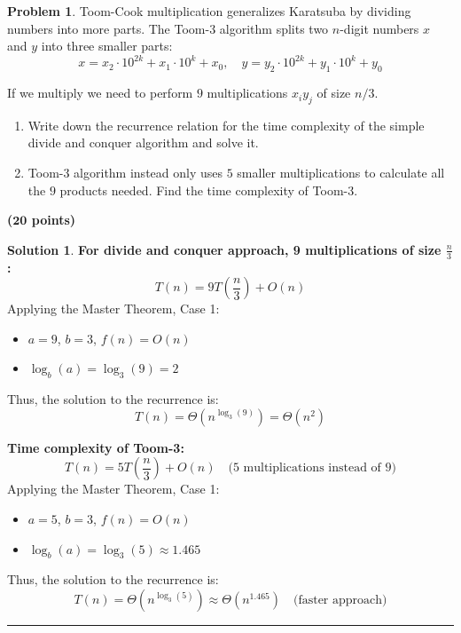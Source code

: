 \documentclass{article}
\theoremstyle{definition}
\newtheorem{problem}{Problem}
\def\fline{\rule{0.75\linewidth}{0.5pt}}
\newcommand{\finishline}{\begin{center}\fline\end{center}}
\newtheorem*{solution*}{Solution}
\newenvironment{solution}{\begin{solution*}}{{\finishline} \end{solution*}}
\newcommand{\grade}[1]{\hfill{\textbf{($\mathbf{#1}$ points)}}}
\begin{document}
\begin{problem}
Toom-Cook multiplication generalizes Karatsuba by dividing numbers into more parts. The Toom-3 algorithm splits two $n$-digit numbers $x$ and $y$ into three smaller parts:
\[
x = x_2 \cdot 10^{2k} + x_1 \cdot 10^k + x_0, \quad y = y_2 \cdot 10^{2k} + y_1 \cdot 10^k + y_0
\]

If we multiply we need to perform $9$  multiplications $x_iy_j$ of size $n/3$.

\begin{enumerate}
    \item Write down the recurrence relation for the time complexity of the simple divide and conquer algorithm and solve it.

\item Toom-3 algorithm instead only uses $5$ smaller multiplications to calculate all the $9$ products needed. Find the time complexity of Toom-3.
    
\end{enumerate}

\end{problem}\grade{20}
\begin{solution}
	\textbf{For divide and conquer approach, 9 multiplications of size \( \frac{n}{3} \):}
	\[
	T(n) = 9T\left(\frac{n}{3}\right) + O(n)
	\]
	Applying the Master Theorem, Case 1:
	\begin{itemize}
	    \item \( a = 9 \), \( b = 3 \), \( f(n) = O(n) \)
	    \item \( \log_b(a) = \log_3(9) = 2 \)
	\end{itemize}
	Thus, the solution to the recurrence is:
	\[
	T(n) = \Theta\left(n^{\log_3(9)}\right) = \Theta(n^2)
	\]
	
	\textbf{Time complexity of Toom-3:}
	\[
	T(n) = 5T\left(\frac{n}{3}\right) + O(n) \quad \text{(5 multiplications instead of 9)}
	\]
	Applying the Master Theorem, Case 1:
	\begin{itemize}
	    \item \( a = 5 \), \( b = 3 \), \( f(n) = O(n) \)
	    \item \( \log_b(a) = \log_3(5) \approx 1.465 \)
	\end{itemize}
	Thus, the solution to the recurrence is:
	\[
	T(n) = \Theta\left(n^{\log_3(5)}\right) \approx \Theta(n^{1.465}) \quad \text{(faster approach)}
	\]
\end{solution}
\end{document}
